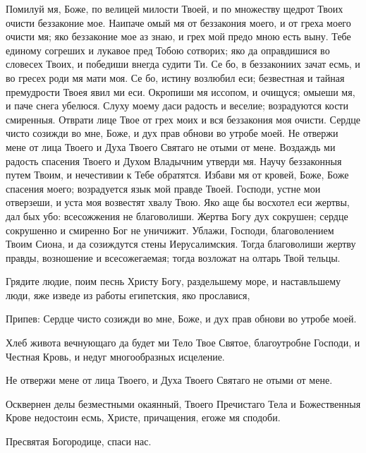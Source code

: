 

Помилуй мя, Боже, по велицей милости Твоей, и по множеству щедрот Твоих очисти беззаконие мое. Наипаче омый мя от беззакония моего, и от греха моего очисти мя; яко беззаконие мое аз знаю, и грех мой предо мною есть выну. Тебе единому согреших и лукавое пред Тобою сотворих; яко да оправдишися во словесех Твоих, и победиши внегда судити Ти. Се бо, в беззакониих зачат есмь, и во гресех роди мя мати моя. Се бо, истину возлюбил еси; безвестная и тайная премудрости Твоея явил ми еси. Окропиши мя иссопом, и очищуся; омыеши мя, и паче снега убелюся. Слуху моему даси радость и веселие; возрадуются кости смиренныя. Отврати лице Твое от грех моих и вся беззакония моя очисти. Сердце чисто созижди во мне, Боже, и дух прав обнови во утробе моей. Не отвержи мене от лица Твоего и Духа Твоего Святаго не отыми от мене. Воздаждь ми радость спасения Твоего и Духом Владычним утверди мя. Научу беззаконныя путем Твоим, и нечестивии к Тебе обратятся. Избави мя от кровей, Боже, Боже спасения моего; возрадуется язык мой правде Твоей. Господи, устне мои отверзеши, и уста моя возвестят хвалу Твою. Яко аще бы восхотел еси жертвы, дал бых убо: всесожжения не благоволиши. Жертва Богу дух сокрушен; сердце сокрушенно и смиренно Бог не уничижит. Ублажи, Господи, благоволением Твоим Сиона, и да созиждутся стены Иерусалимския. Тогда благоволиши жертву правды, возношение и всесожегаемая; тогда возложат на олтарь Твой тельцы.







Грядите людие, поим песнь Христу Богу, раздельшему море, и наставльшему люди, яже изведе из работы египетския, яко прославися,


Припев: Сердце чисто созижди во мне, Боже, и дух прав обнови во утробе моей.


Хлеб живота вечнующаго да будет ми Тело Твое Святое, благоутробне Господи, и Честная Кровь, и недуг многообразных исцеление.




Не отвержи мене от лица Твоего, и Духа Твоего Святаго не отыми от мене.


Осквернен делы безместными окаянный, Твоего Пречистаго Тела и Божественныя Крове недостоин есмь, Христе, причащения, егоже мя сподоби.




Пресвятая Богородице, спаси нас.


